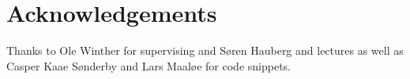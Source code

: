 \section{Acknowledgements}
\label{sec:acknowledgements}

Thanks to Ole Winther for supervising and Søren Hauberg and lectures as well as Casper Kaae Sønderby and Lars Maaløe for code snippets.
